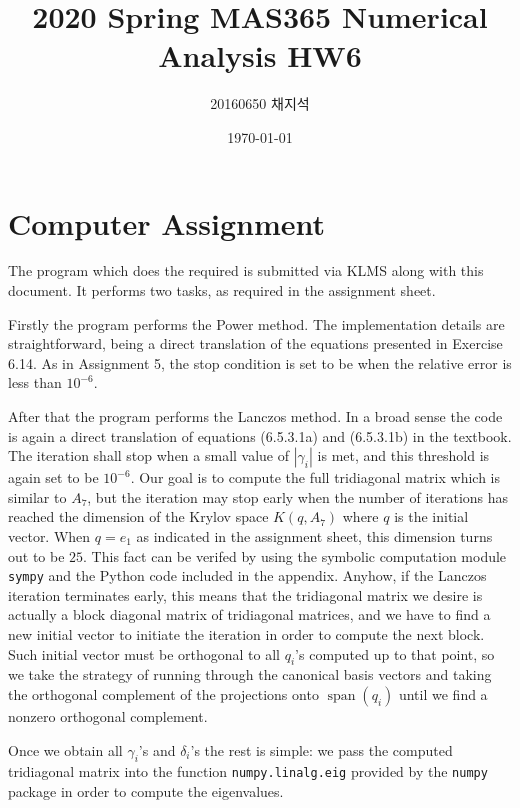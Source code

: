 \documentclass{article}
\title{2020 Spring MAS365 Numerical Analysis HW6}
\author{20160650 채지석}
\date{\today}
\newcommand{\card}[1]{\left\lvert#1\right\rvert}
\begin{document}
\section*{Computer Assignment}
The program which does the required is submitted via KLMS along with this document. It performs two tasks, as required in the assignment sheet.

Firstly the program performs the Power method. The implementation details are straightforward, being a direct translation of the equations presented in Exercise 6.14. As in Assignment 5, the stop condition is set to be when the relative error is less than $10^{-6}$. 

After that the program performs the Lanczos method. In a broad sense the code is again a direct translation of equations (6.5.3.1a) and (6.5.3.1b) in the textbook. The iteration shall stop when a small value of $\card{\gamma_i}$ is met, and this threshold is again set to be $10^{-6}$. Our goal is to compute the full tridiagonal matrix which is similar to $A_7$, but the iteration may stop early when the number of iterations has reached the dimension of the Krylov space $K(q, A_7)$ where $q$ is the initial vector. When $q = e_1$ as indicated in the assignment sheet, this dimension turns out to be $25$. This fact can be verifed by using the symbolic computation module \texttt{sympy} and the Python code included in the appendix. Anyhow, if the Lanczos iteration terminates early, this means that the tridiagonal matrix we desire is actually a block diagonal matrix of tridiagonal matrices, and we have to find a new initial vector to initiate the iteration in order to compute the next block. Such initial vector must be orthogonal to all $q_i$'s computed up to that point, so we take the strategy of running through the canonical basis vectors and taking the orthogonal complement of the projections onto $\operatorname{span}(q_i)$ until we find a nonzero orthogonal complement.  

Once we obtain all $\gamma_i$'s and $\delta_i$'s the rest is simple: we pass the computed tridiagonal matrix into the function \texttt{numpy.linalg.eig} provided by the \texttt{numpy} package in order to compute the eigenvalues.
\end{document}
